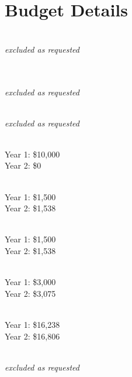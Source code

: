 \documentclass[12pt, preprint]{hacked-aastex}
\begin{document}
\clearpage
\section{Budget Details}
\label{sec:budget-details}

\\
{\it excluded as requested}

\\
\\
{\it excluded as requested}

\\
{\it excluded as requested}

\\
Year 1: \$10,000\\
Year 2: \$0

\\
Year 1: \$1,500\\
Year 2: \$1,538

\\
Year 1: \$1,500\\
Year 2: \$1,538

\\
Year 1: \$3,000\\
Year 2: \$3,075

\\
Year 1: \$16,238\\
Year 2: \$16,806

\\
{\it excluded as requested}
\end{document}
